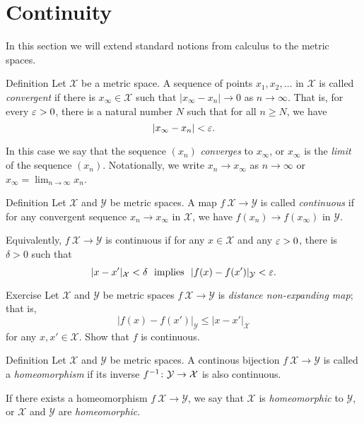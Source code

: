 \section{Continuity}

In this section we will extend standard notions from calculus to the metric spaces.

\begin{thm}{Definition}
 Let ${\mathcal X}$ be a metric space.
A sequence of points $x_1, x_2, \ldots$ in ${\mathcal X}$ is called \emph{convergent}
if there is 
$x_\infty\in {\mathcal X}$ such that $|x_\infty -x_n|\to 0$ as $n\to\infty$.  
That is, for every $\varepsilon > 0$, there is a natural number $N$ such that for all $n \ge N$, we have $$|x_\infty-x_n| < \varepsilon.$$

In this case we say that the sequence $(x_n)$ \emph{converges} to $x_\infty$, 
or $x_\infty$ is the \emph{limit} of the sequence $(x_n)$.
Notationally, we write $x_n\to x_\infty$ as $n\to\infty$
or $x_\infty=\lim_{n\to\infty} x_n$.
\end{thm}

\begin{thm}{Definition}
Let ${\mathcal X}$ and ${\mathcal Y}$ be metric spaces.
A map $f\:{\mathcal X}\to {\mathcal Y}$ is called \emph{continuous} if for any convergent sequence $x_n\to x_\infty$ in ${\mathcal X}$,
we have $f(x_n) \to f(x_\infty)$ in ${\mathcal Y}$.

Equivalently, $f\:{\mathcal X}\to {\mathcal Y}$ is continuous if for any $x\in {\mathcal X}$ and any $\varepsilon>0$,
there is $\delta>0$ such that 
$$|x-x'|_{\mathcal X}<\delta\ \text{ implies }\ |f(x)-f(x')|_{\mathcal Y}<\eps.$$

\end{thm}

\begin{thm}{Exercise}
Let ${\mathcal X}$ and ${\mathcal Y}$ be metric spaces $f\:{\mathcal X}\to {\mathcal Y}$ is \emph{distance non-expanding map}; that is, 
\[|f(x)-f(x')|_{\mathcal Y}\le |x-x'|_{\mathcal X}\]
for any $x,x'\in \mathcal X$.
Show that $f$ is continuous.
\end{thm}

\begin{thm}{Definition}
Let ${\mathcal X}$ and ${\mathcal Y}$ be metric spaces.
A continous bijection $f\:{\mathcal X}\to {\mathcal Y}$ 
is called a \emph{homeomorphism} 
if its inverse $f^{-1}\:{\mathcal Y}\z\to {\mathcal X}$ is also continuous.

If there exists a homeomorphism $f\:{\mathcal X}\to {\mathcal Y}$,
we say that ${\mathcal X}$ is \emph{homeomorphic} to ${\mathcal Y}$,
or  $\mathcal X$ and ${\mathcal Y}$ are \emph{homeomorphic}.
\end{thm}

